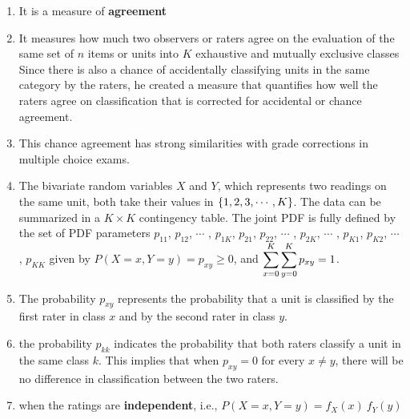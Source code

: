 \begin{enumerate}
    \item It is a measure of \textbf{agreement}
    \hfill \cite{statistics/book/Statistics-for-Data-Scientists/Maurits-Kaptein}

    \item It measures how much two observers or raters agree on the evaluation of the same set of $n$ items or units into $K$ exhaustive and mutually exclusive classes
    Since there is also a chance of accidentally classifying units in the same category by the raters, he created a measure that quantifies how well the raters agree on classification that is corrected for accidental or chance agreement. 
    \hfill \cite{statistics/book/Statistics-for-Data-Scientists/Maurits-Kaptein}

    \item This chance agreement has strong similarities with grade corrections in multiple choice exams.
    \hfill \cite{statistics/book/Statistics-for-Data-Scientists/Maurits-Kaptein}

    \item The bivariate random variables $X$ and $Y$, which represents two readings on the same unit, both take their values in $\left\{1, 2, 3, \cdots , K \right\}$. 
    The data can be summarized in a $K \times K$ contingency table.
    The joint PDF is fully defined by the set of PDF parameters $p_{11}$, $p_{12}$, $\cdots$ , $p_{1K}$, $p_{21}$, $p_{22}$, $\cdots$ , $p_{2K}$, $\cdots$ , $p_{K 1}$, $p_{K 2}$, $\cdots$ , $p_{K K}$ given by $P(X = x, Y = y) = p_{x y} \geq 0$, and $\displaystyle\sum^K_{x=0} \displaystyle\sum^K_{y=0} p_{x y} = 1$.
    \hfill \cite{statistics/book/Statistics-for-Data-Scientists/Maurits-Kaptein}

    \item The probability $p_{x y}$ represents the probability that a unit is classified by the first rater in class $x$ and by the second rater in class $y$. 
    \hfill \cite{statistics/book/Statistics-for-Data-Scientists/Maurits-Kaptein}

    \item the probability $p_{kk}$ indicates the probability that both raters classify a unit in the same class $k$. 
    This implies that when $p_{x y} = 0$ for every $x \neq y$, there will be no difference in classification between the two raters.
    \hfill \cite{statistics/book/Statistics-for-Data-Scientists/Maurits-Kaptein}

    \item when the ratings are \textbf{independent}, i.e., $P(X = x, Y = y) = f_X (x)\ f_Y (y)$
    \hfill \cite{statistics/book/Statistics-for-Data-Scientists/Maurits-Kaptein}


\end{enumerate}
